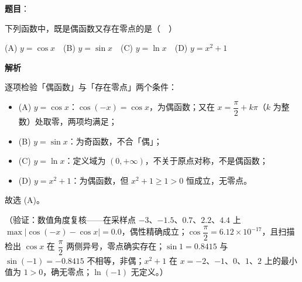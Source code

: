 \begin{answer}

\textbf{题目}：

下列函数中，既是偶函数又存在零点的是（　）

(A) \(y=\cos x\)　(B) \(y=\sin x\)　(C) \(y=\ln x\)　(D) \(y=x^2+1\)

\textbf{解析}

逐项检验「偶函数」与「存在零点」两个条件：

\begin{itemize}
\item (A) \(y=\cos x\)：\(\cos(-x)=\cos x\)，为偶函数；又在 \(x=\dfrac{\pi}{2}+k\pi\)（\(k\) 为整数）处取零，两项均满足；
\item (B) \(y=\sin x\)：为奇函数，不合「偶」；
\item (C) \(y=\ln x\)：定义域为 \((0,+\infty)\)，不关于原点对称，不是偶函数；
\item (D) \(y=x^2+1\)：为偶函数，但 \(x^2+1\geqslant 1>0\) 恒成立，无零点。
\end{itemize}

故选 (A)。

（验证：数值角度复核——在采样点 \(-3\)、\(-1.5\)、\(0.7\)、\(2.2\)、\(4.4\) 上 \(\max|\cos(-x)-\cos x|=0.0\)，偶性精确成立；\(\cos\dfrac{\pi}{2}=6.12\times 10^{-17}\)，且扫描检出 \(\cos x\) 在 \(\dfrac{\pi}{2}\) 两侧异号，零点确实存在；\(\sin 1=0.8415\) 与 \(\sin(-1)=-0.8415\) 不相等，非偶；\(x^2+1\) 在 \(x=-2\)、\(-1\)、\(0\)、\(1\)、\(2\) 上的最小值为 \(1>0\)，确无零点；\(\ln(-1)\) 无定义。）


\end{answer}
